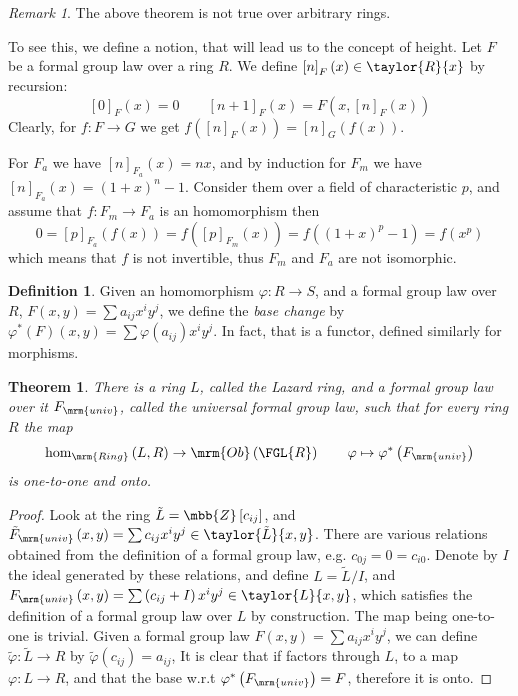 \documentclass{article}
\newtheorem*{theorem*}{Theorem}
\theoremstyle{definition}
\newtheorem*{definition*}{Definition}
\theoremstyle{remark}
\newtheorem*{remark*}{Remark}
\begin{document}
	\begin{remark*}
		The above theorem is not true over arbitrary rings.
		
		To see this, we define a notion, that will lead us to the concept of height.
		Let $F$ be a formal group law over a ring $R$. We define $\left[n\right]_F \left(x\right) \in \taylor{R}{x}$ by recursion:
		$$
			\left[0\right]_F \left(x\right) = 0
			\qquad
			\left[n+1\right]_F \left(x\right) = F\left(x, \left[n\right]_F \left(x\right)\right)
		$$
		Clearly, for $f: F \to G$ we get
		$
			f\left(\left[n\right]_F \left(x\right)\right)
			=
			\left[n\right]_G \left(f\left(x\right)\right)
		$.
		
		For $F_a$ we have $\left[n\right]_{F_a} \left(x\right) = nx$,
		and by induction for $F_m$ we have $\left[n\right]_{F_a} \left(x\right) = \left(1+x\right)^n - 1$.
		Consider them over a field of characteristic $p$, and assume that $f: F_m \to F_a$ is an homomorphism then
		$$
			0
			=
			\left[p\right]_{F_a} \left(f\left(x\right)\right)
			=
			f\left(\left[p\right]_{F_m} \left(x\right)\right)
			=
			f\left(\left(1+x\right)^p-1\right)
			=
			f\left(x^p\right)
		$$
		which means that $f$ is not invertible, thus $F_m$ and $F_a$ are not isomorphic.
	\end{remark*}

	\begin{definition*}
		Given an homomorphism $\varphi: R \to S$,
		and a formal group law over $R$, $F\left(x,y\right) = \sum a_{ij} x^i y^j$,
		we define the \emph{base change} by
		$
			\varphi^*\left(F\right)\left(x,y\right)
			=
			\sum \varphi\left(a_{ij}\right) x^i y^j
		$.
		In fact, that is a functor, defined similarly for morphisms.
	\end{definition*}

	\begin{theorem*}
		There is a ring $L$, called the \emph{Lazard ring}, and a formal group law over it $F_\mrm{univ}$, called \emph{the universal formal group law},
		such that for every ring $R$ the map
		$$
			\hom_\mrm{Ring}\left(L,R\right)
			\to
			\mrm{Ob}\left(\FGL{R}\right)
			\qquad
			\varphi \mapsto \varphi^*\left(F_\mrm{univ}\right)
		$$
		is one-to-one and onto.
	\end{theorem*}

	\begin{proof}
		Look at the ring $\tilde{L} = \mbb{Z}\left[c_{ij}\right]$,
		and
		$
			\tilde{F}_\mrm{univ}\left(x,y\right)
			=
			\sum c_{ij} x^i y^j
			\in
			\taylor{\tilde{L}}{x,y}
		$.
		There are various relations obtained from the definition of a formal group law, e.g. $c_{0j} = 0 = c_{i0}$.
		Denote by $I$ the ideal generated by these relations, and define $L=\tilde{L}/I$,
		and
		$
			F_\mrm{univ}\left(x,y\right)
			=
			\sum \left(c_{ij} + I\right) x^i y^j
			\in
			\taylor{L}{x,y}
		$,
		which satisfies the definition of a formal group law over $L$ by construction.
		The map being one-to-one is trivial.
		Given a formal group law $F\left(x,y\right) = \sum a_{ij} x^i y^j$,
		we can define $\tilde{\varphi}: \tilde{L} \to R$ by $\tilde{\varphi}\left(c_{ij}\right) = a_{ij}$,
		It is clear that if factors through $L$, to a map $\varphi: L \to R$, and that the base w.r.t $\varphi^*\left(F_\mrm{univ}\right) = F$,
		therefore it is onto.
	\end{proof}
\end{document}
